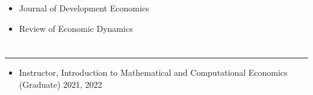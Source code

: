 \documentclass[12pt]{article}
\newenvironment{customitemize}
{ \begin{itemize}[leftmargin=\parindent, topsep = 1pt, itemsep = -1pt] }
{\end{itemize} }
\begin{document}
\begin{customitemize}
	\item Journal of Development Economics
	\item Review of Economic Dynamics
\end{customitemize}

\section*{}
\noindent \rule{\textwidth}{1pt} 
\begin{customitemize}
	\item Instructor, Introduction to Mathematical and Computational Economics (Graduate) \hfill 2021, 2022
\end{customitemize}


\end{document}
